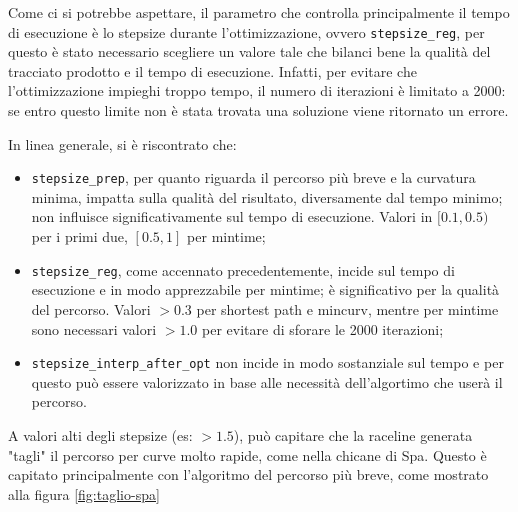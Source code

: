 Come ci si potrebbe aspettare, il parametro che controlla principalmente il tempo di esecuzione è lo
stepsize durante l'ottimizzazione, ovvero \verb|stepsize_reg|, per questo è stato necessario scegliere un
valore tale che bilanci bene la qualità del tracciato prodotto e il tempo di esecuzione. Infatti, per
evitare che l'ottimizzazione impieghi troppo tempo, il numero di iterazioni è limitato a 2000: se entro
questo limite non è stata trovata una soluzione viene ritornato un errore.

In linea generale, si è riscontrato che:
\begin{itemize}
	\item \verb|stepsize_prep|, per quanto riguarda il percorso più breve e la curvatura minima, impatta
		sulla qualità del risultato, diversamente dal tempo minimo; non influisce significativamente sul
		tempo di esecuzione. Valori in $[0.1, 0.5)$ per i primi due, $[0.5, 1]$ per mintime;
	\item \verb|stepsize_reg|, come accennato precedentemente, incide sul tempo di esecuzione
		e in modo apprezzabile per mintime; è significativo per la qualità del percorso. Valori $ > 0.3$
		per shortest path e mincurv, mentre per mintime sono necessari valori $> 1.0$ per evitare di
		sforare le 2000 iterazioni;
	\item \verb|stepsize_interp_after_opt| non incide in modo sostanziale sul tempo e per questo può
		essere valorizzato in base alle necessità dell'algortimo che userà il percorso.
\end{itemize}
A valori alti degli stepsize (es: $> 1.5$), può capitare che la raceline generata "tagli" il percorso per
curve molto rapide, come nella chicane di Spa. Questo è capitato principalmente con l'algoritmo del
percorso più breve, come mostrato alla figura \ref{fig:taglio-spa}

